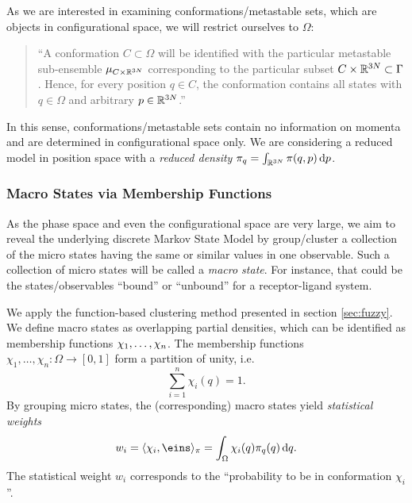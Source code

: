As we are interested in examining conformations/metastable sets, which are objects in configurational space, we will restrict ourselves to $\Omega$:
\begin{quote}
``A conformation $C \subset \Omega$ will be identified with the particular metastable sub-ensemble $\mu_{C \times \mathbb{R}^{3N}}$ corresponding to the particular subset $C \times \mathbb{R}^{3N} \subset \Gamma$. Hence, for every position $q \in C$, the conformation contains all states with $q \in \Omega$ and arbitrary $p \in \mathbb{R}^{3N}$.''
\end{quote}
In this sense, conformations/metastable sets contain no information on momenta and are determined in configurational space only. We are considering a reduced model in position space with a \textit{reduced density} $\pi_q = \int_{\mathbb{R}^{3N}} \pi(q,p) \mathop{}\!\mathrm{d} p$. 


\subsubsection*{Macro States via Membership Functions}

As the phase space and even the configurational space are very large, we aim to reveal the underlying  discrete Markov State Model by  group/cluster a collection of the micro states having the same or similar values in one observable. Such a collection of micro states will be called a \textit{macro state}.
For instance, that could be the states/observables ``bound'' or ``unbound'' for a receptor-ligand system.

We apply the function-based clustering method presented in section \ref{sec:fuzzy}. 
We define macro states as overlapping partial densities, which can be identified as membership functions $\chi_1,\dots,\chi_n$.
The membership functions $\chi_1,\dots,\chi_n : \Omega \rightarrow [0,1]$ form a partition of unity, i.e.
\begin{equation}
\label{eq:statistical_weights}
\sum_{i=1}^n \chi_i(q) = 1.
\end{equation}
By grouping micro states, the (corresponding) macro states yield \textit{statistical weights}
\begin{equation*}
w_i = \langle \chi_i, \eins \rangle_\pi = \int_\Omega \chi_i(q) \pi_q(q) \diff q.
\end{equation*}
The statistical weight $w_i$ corresponds to the ``probability to be in conformation $\chi_i$''.

